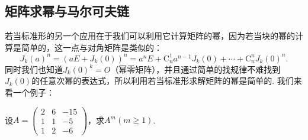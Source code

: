 \subsection{矩阵求幂与马尔可夫链}

若当标准形的另一个应用在于我们可以利用它计算矩阵的幂，因为若当块的幂的计算是简单的，这一点与对角矩阵是类似的：
\begin{equation} \label{eq:若当块幂}
    J_k(a)^n=(aE+J_k(0))^n=a^nE+\mathrm{C}_n^1a^{n-1}J_k(0)+\cdots+\mathrm{C}_n^nJ_k(0)^n.
\end{equation}
同时我们也知道$J_k(0)^k=O$（幂零矩阵），并且通过简单的找规律不难找到$J_k(0)$的任意次幂的表达式，所以利用若当标准形求解矩阵的幂是简单的. 我们来看一个例子：
\begin{example}{}{}
    设$A=\begin{pmatrix}
            2 & 6 & -15 \\ 1 & 1 & -5 \\ 1 & 2 & -6
        \end{pmatrix}$，求$A^{m}(m\geqslant 1)$.
\end{example}
